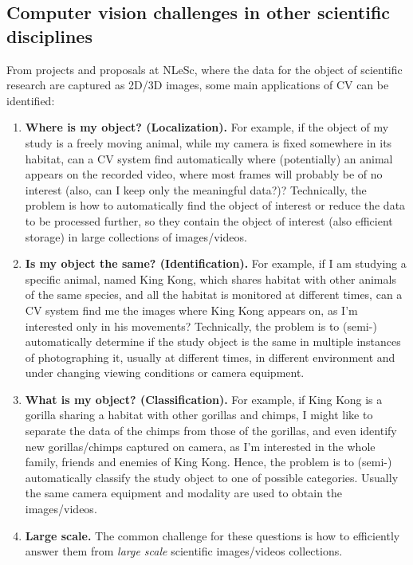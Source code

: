 \subsection{Computer vision challenges in other scientific disciplines}
From projects and proposals at NLeSc, where the data for the object of scientific research are captured as 2D/3D images, some main applications of CV can be identified:
\begin{enumerate}
\item {\bf Where is my object? (Localization).} For example, if the object of my study is a freely moving animal, while my camera is fixed somewhere in its habitat, can a CV system find automatically where (potentially) an animal appears on the recorded video, where most frames will probably be of no interest (also, can I keep only the meaningful data?)? Technically, the problem is how to automatically find the object of interest or reduce the data to be processed further, so they contain the object of interest (also efficient storage) in large collections of images/videos.
\item {\bf Is my object the same? (Identification).} For example, if I am studying a specific animal, named King Kong, which shares habitat with other animals of the same species, and all the habitat is monitored at different times, can a CV system find me the images where King Kong appears on, as I'm interested only in his movements? Technically, the problem is to (semi-) automatically determine if the study object is the same in multiple instances of photographing it, usually at different times, in different environment and under changing viewing conditions or camera equipment.
\item {\bf What is my object? (Classification).} For example, if King Kong is a gorilla sharing a habitat with other gorillas and chimps, I might like to separate the data of the chimps from those of the gorillas, and even identify new gorillas/chimps captured on camera, as I'm interested in the whole family, friends and enemies of King Kong. Hence, the problem is to (semi-) automatically classify the study object to one of possible categories. Usually the same camera equipment and modality are used to obtain the images/videos.
\item{\bf Large scale.} The common challenge for these questions is how to efficiently answer them from {\em large scale} scientific images/videos collections.
\end{enumerate}

